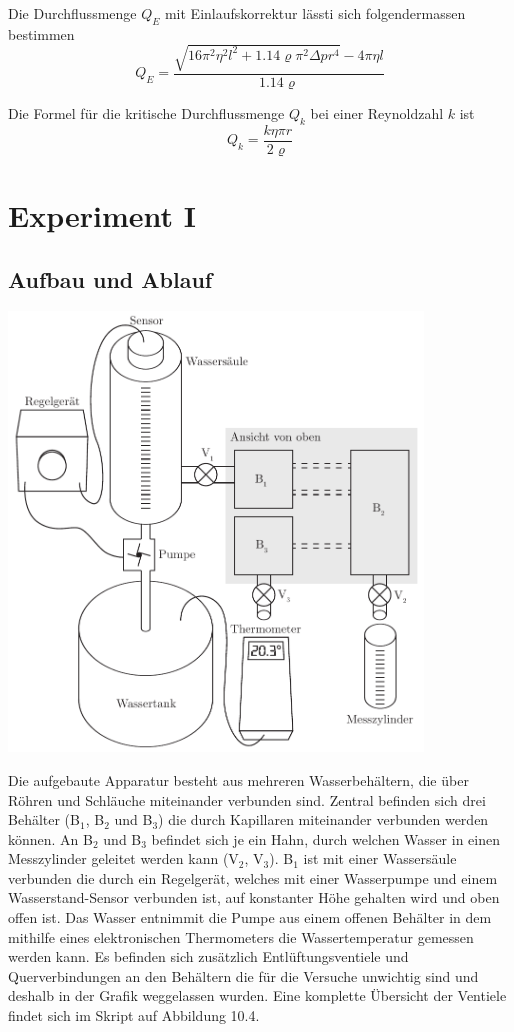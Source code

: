 \documentclass[12pt,a4paper]{article}
\newcommand{\subscript}[1]{$_{#1}$}
\newcommand{\B}[1]{B\subscript{#1}}
\newcommand{\V}[1]{V\subscript{#1}}
\begin{document}
Die Durchflussmenge $Q_{E}$ mit Einlaufskorrektur l\"assti sich folgendermassen bestimmen
\begin{equation}
Q_E = \frac{\sqrt{16\pi^2\eta^2l^2 + 1.14\varrho \pi^2 \Delta p r^4} - 4 \pi \eta l}{1.14 \varrho}
\end{equation}

Die Formel f\"ur die kritische Durchflussmenge $Q_{k}$ bei einer Reynoldzahl $k$ ist
\begin{equation}
Q_k = \frac{k\eta \pi r}{2\varrho}
\end{equation}

\section*{Experiment I}

\subsection*{Aufbau und Ablauf}
\begin{center}
\includegraphics[width=11cm]{illustration.pdf}
\end{center}

Die aufgebaute Apparatur besteht aus mehreren Wasserbeh\"altern, die \"uber R\"ohren und Schl\"auche miteinander verbunden sind. Zentral befinden sich drei Beh\"alter (\B{1}, \B{2} und \B{3}) die durch Kapillaren miteinander verbunden werden k\"onnen. An \B{2} und \B{3} befindet sich je ein Hahn, durch welchen Wasser in einen Messzylinder geleitet werden kann (\V{2}, \V{3}). \B{1} ist mit einer Wassers\"aule verbunden die durch ein Regelger\"at, welches mit einer Wasserpumpe und einem Wasserstand-Sensor verbunden ist, auf konstanter H\"ohe gehalten wird und oben offen ist. Das Wasser entnimmit die Pumpe aus einem offenen Beh\"alter in dem mithilfe eines elektronischen Thermometers die Wassertemperatur gemessen werden kann. Es befinden sich zus\"atzlich Entl\"uftungsventiele und Querverbindungen an den Beh\"altern die f\"ur die Versuche unwichtig sind und deshalb in der Grafik weggelassen wurden. Eine komplette \"Ubersicht der Ventiele findet sich im Skript auf Abbildung 10.4.
\end{document}

